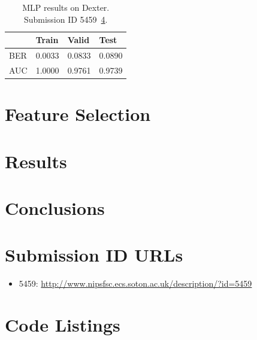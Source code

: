 \documentclass{ecsarticle}     %
\begin{document}
\begin{table}[h]
	\centering
	\begin{tabular}{|l|l|l|l|} \hline
     			& Train & Valid & Test \\ \hline
		BER & 0.0033 & 0.0833 & 0.0890 \\ \hline
		AUC & 1.0000 & 0.9761 & 0.9739 \\ \hline
	\end{tabular}
	\caption{MLP results on Dexter. Submission ID 5459~\ref{sec:id}.}
	\label{tab:mlp_dexter}
\end{table}




\section{Feature Selection}

\section{Results}

\section{Conclusions}


\newpage






\backmatter
\begin{appendix}

\newpage

\section{Submission ID URLs}
\label{sec:id}
\begin{itemize}
	\item 5459: \href{http://www.nipsfsc.ecs.soton.ac.uk/description/?id=5459}{http://www.nipsfsc.ecs.soton.ac.uk/description/?id=5459}
\end{itemize}
\section{Code Listings}

\end{appendix}

\end{document}
